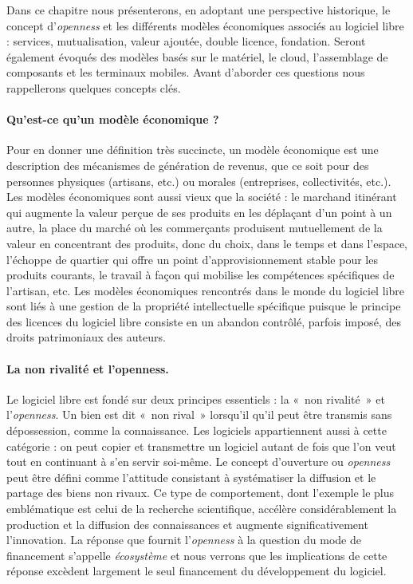 \documentclass{FramateX}
\begin{document}
\begin{refsection}
Dans ce chapitre nous présenterons, en adoptant une perspective
historique, le concept d'\textit{openness} et les
différents modèles économiques associés au logiciel libre : services,
mutualisation, valeur ajoutée, double licence, fondation. Seront
également évoqués des modèles basés sur le matériel, le cloud,
l'assemblage de composants et les terminaux mobiles.
Avant d'aborder ces questions nous rappellerons quelques concepts
clés.

\paragraph{Qu'est-ce qu'un modèle économique ?} Pour en donner une définition très succincte, un modèle économique est
une description des mécanismes de génération de revenus, que ce soit
pour des personnes physiques (artisans, etc.) ou morales (entreprises,
collectivités, etc.). Les modèles économiques sont aussi vieux que la
société : le marchand itinérant qui augmente la valeur perçue de ses
produits en les déplaçant d'un point à un autre, la
place du marché où les commerçants produisent mutuellement de la valeur
en concentrant des produits, donc du choix, dans le temps et dans
l'espace, l'échoppe de quartier qui
offre un point d'approvisionnement stable pour les produits courants,
le travail à façon qui mobilise les compétences spécifiques de
l'artisan, etc. Les modèles économiques rencontrés dans le monde du
logiciel libre sont liés à une gestion de la propriété intellectuelle
spécifique puisque le principe des licences du logiciel libre consiste
en un abandon contrôlé, parfois imposé, des droits patrimoniaux des
auteurs.

\paragraph{La non rivalité et l'openness.}
Le logiciel libre est fondé sur deux principes essentiels : la «~non
rivalité~» et l'\textit{openness}. Un bien est dit «~non rival~»
lorsqu'il qu'il peut être transmis sans dépossession, comme la
connaissance. Les logiciels appartiennent aussi à cette catégorie : on
peut copier et transmettre un logiciel autant de fois que l'on veut
tout en continuant à s'en servir soi-même. Le concept d'ouverture ou
\textit{openness} peut être défini comme l'attitude consistant à
systématiser la diffusion et le partage des biens non rivaux. Ce type
de comportement, dont l'exemple le plus emblématique est celui de la
recherche scientifique, accélère considérablement la production et la
diffusion des connaissances et augmente significativement l'innovation.
La réponse que fournit l'\textit{openness} à la question du mode de
financement s'appelle \textit{écosystème} et nous verrons que les
implications de cette réponse excèdent largement le seul financement du
développement du logiciel.


\end{refsection}
\end{document}
